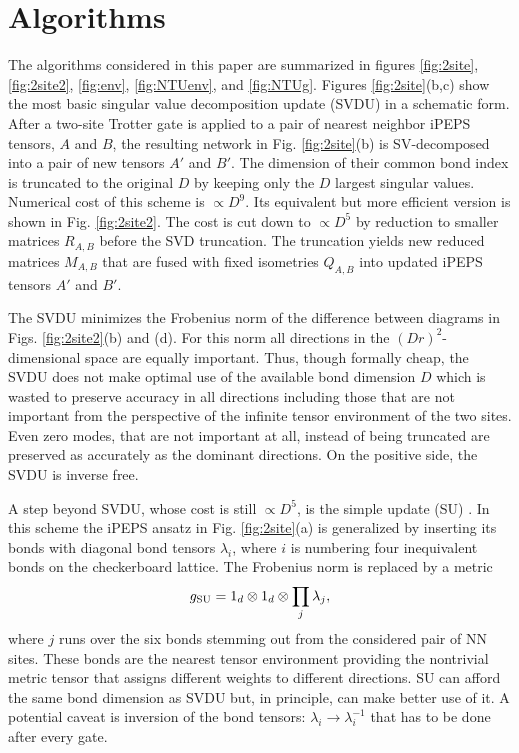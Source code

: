 \documentclass[prb,twocolumn,showkeys,showpacs,amsmath,amsfonts,floatfix,superscriptaddress,nofootinbib]{revtex4-1}
\def\be{\begin{equation}}
\def\ee{\end{equation}}
\begin{document}
\section{Algorithms}
\label{sec:algorithms}

The algorithms considered in this paper are summarized in figures \ref{fig:2site}, \ref{fig:2site2}, \ref{fig:env}, \ref{fig:NTUenv}, and \ref{fig:NTUg}. Figures \ref{fig:2site}(b,c) show the most basic singular value decomposition update (SVDU) in a schematic form. After a two-site Trotter gate is applied to a pair of nearest neighbor iPEPS tensors, $A$ and $B$, the resulting network in Fig. \ref{fig:2site}(b) is SV-decomposed into a pair of new tensors $A'$ and $B'$. The dimension of their common bond index is truncated to the original $D$ by keeping only the $D$ largest singular values. Numerical cost of this scheme is $\propto D^9$. Its equivalent but more efficient version is shown in Fig. \ref{fig:2site2}. The cost is cut down to $\propto D^5$ by reduction to smaller matrices $R_{A,B}$ before the SVD truncation. The truncation yields new reduced matrices $M_{A,B}$ that are fused with fixed isometries $Q_{A,B}$ into updated iPEPS tensors $A'$ and $B'$.

The SVDU minimizes the Frobenius norm of the difference between diagrams in Figs. \ref{fig:2site2}(b) and (d). For this norm all directions in the $(Dr)^2$-dimensional space are equally important. Thus, though formally cheap, the SVDU does not make optimal use of the available bond dimension $D$ which is wasted to preserve accuracy in all directions including those that are not important from the perspective of the infinite tensor environment of the two sites. Even zero modes, that are not important at all, instead of being truncated are preserved as accurately as the dominant directions. On the positive side, the SVDU is inverse free.

A step beyond SVDU, whose cost is still $\propto D^5$, is the simple update (SU) \cite{Orus_review_14}. In this scheme the iPEPS ansatz in Fig. \ref{fig:2site}(a) is generalized by inserting its bonds with diagonal bond tensors $\lambda_i$, where $i$ is numbering four inequivalent bonds on the checkerboard lattice. The Frobenius norm is replaced by a metric
\be 
g_{\rm SU} = 1_d \otimes 1_d \otimes \prod_j \lambda_j,
\ee 
where $j$ runs over the six bonds stemming out from the considered pair of NN sites. These bonds are the nearest tensor environment providing the nontrivial metric tensor that assigns different weights to different directions. SU can afford the same bond dimension as SVDU but, in principle, can make better use of it. A potential caveat is inversion of the bond tensors: $\lambda_i\to\lambda_i^{-1}$ that has to be done after every gate. 
\end{document}

